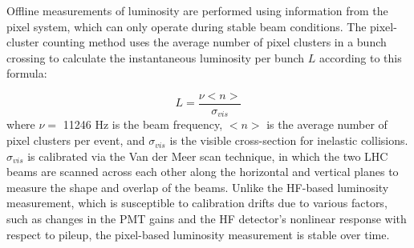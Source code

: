 Offline measurements of luminosity are performed using information from the pixel system, which can only operate during stable beam conditions. The pixel-cluster counting method uses the average number of pixel clusters in a bunch crossing to calculate the instantaneous luminosity per bunch $L$ according to this formula:

\begin{equation}
L = \frac{\nu<n>}{\sigma_{vis}}
\label{eq:luminositycalculation}
\end{equation}
where $\nu =$ 11246 Hz is the beam frequency, $<n>$ is the average number of pixel clusters per event, and $\sigma_{vis}$ is the visible cross-section for inelastic collisions. $\sigma_{vis}$ is calibrated via the Van der Meer scan technique, in which the two LHC beams are scanned across each other along the horizontal and vertical planes to measure the shape and overlap of the beams. Unlike the HF-based luminosity measurement, which is susceptible to calibration drifts due to various factors, such as changes in the PMT gains and the HF detector's nonlinear response with respect to pileup, the pixel-based luminosity measurement is stable over time.